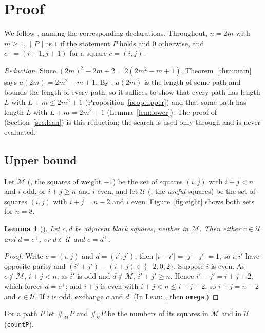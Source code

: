 \documentclass[11pt]{amsart}
\theoremstyle{plain}
\newtheorem{lemma}[theorem]{Lemma}
\theoremstyle{definition}
\newcommand{\Ib}[1]{[\,#1\,]}
\newcommand{\cM}{\mathcal{M}}
\newcommand{\cU}{\mathcal{U}}
\begin{document}
\section{Proof}\label{sec:proof}

We follow , naming the corresponding declarations. Throughout, $n=2m$ with $m\ge1$, $\Ib{P}$ is $1$ if the statement $P$ holds and $0$ otherwise, and $c^+=(i+1,j+1)$ for a square $c=(i,j)$.

\emph{Reduction.} Since $(2m)^2-2m+2=2(2m^2-m+1)$, Theorem~\ref{thm:main} says $a(2m)=2m^2-m+1$. By , $a(2m)$ is the length of some path and bounds the length of every path, so it suffices to show that every path has length $L$ with $L+m\le 2m^2+1$ (Proposition~\ref{prop:upper}) and that some path has length $L$ with $L+m=2m^2+1$ (Lemma~\ref{lem:lower}). The proof of  (Section~\ref{sec:lean}) is this reduction; the search  is used only through  and is never evaluated.

\subsection{Upper bound}
Let $\cM$ (, the squares of weight $-1$) be the set of squares $(i,j)$ with $i+j<n$ and $i$ odd, or $i+j\ge n$ and $i$ even, and let $\cU$ (, the \emph{useful} squares) be the set of squares $(i,j)$ with $i+j=n-2$ and $i$ even. Figure~\ref{fig:eight} shows both sets for $n=8$.

\begin{lemma}[]\label{lem:pp}
Let $c,d$ be adjacent black squares, neither in $\cM$. Then either $c\in\cU$ and $d=c^+$, or $d\in\cU$ and $c=d^+$.
\end{lemma}

\begin{proof}
Write $c=(i,j)$ and $d=(i',j')$; then $|i-i'|=|j-j'|=1$, so $i,i'$ have opposite parity and $(i'+j')-(i+j)\in\{-2,0,2\}$. Suppose $i$ is even. As $c\notin\cM$, $i+j<n$; as $i'$ is odd and $d\notin\cM$, $i'+j'\ge n$. Hence $i'+j'=i+j+2$, which forces $d=c^+$; and $i+j$ is even with $i+j<n\le i+j+2$, so $i+j=n-2$ and $c\in\cU$. If $i$ is odd, exchange $c$ and $d$. (In Lean: , then \texttt{omega}.)
\end{proof}

For a path $P$ let $\#_\cM P$ and $\#_\cU P$ be the numbers of its squares in $\cM$ and in $\cU$ (\texttt{countP}).
\end{document}

